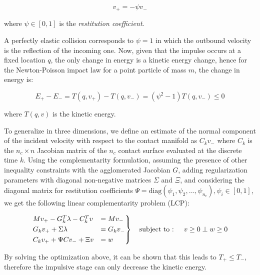 \begin{equation}
    v _{+} = -\psi v _{-}
\end{equation}

where $\psi \in [0,1]$ is the \textit{restitution coefficient}.

A perfectly elastic collision corresponds to $\psi = 1$ in which the outbound velocity is the reflection of the incoming one. Now, given that the impulse occurs at a fixed location $q$, the only change in energy is a kinetic energy change, hence for the Newton-Poisson impact law for a point particle of mass $m$, the change in energy is:

\begin{equation}
    E _{+} - E _{-} = T(q, v _{+}) - T(q, v _{-}) = (\psi ^2 - 1) T(q, v _{-}) \leq 0
\end{equation}

where $T(q, v)$ is the kinetic energy.

To generalize in three dimensions, we define an estimate of the normal component of the incident velocity with respect to the contact manifold as $C _k v _{-}$ where $C _k$ is the $n _c \times n$ Jacobian matrix of the $n _c$ contact surface evaluated at the discrete time $k$. Using the complementarity formulation, assuming the presence of other inequality constraints with the agglomerated Jacobian $G$, adding regularization parameters with diagonal non-negative matrices $\Sigma$ and $\Xi$, and considering the diagonal matrix for restitution coefficients $\Psi = \text{diag}(\psi _1, \psi _2, \dots, \psi _{n _c}),  \psi _i \in [0, 1]$, we get the following linear complementarity problem (LCP):

\begin{equation}
    \begin{rcases}
        Mv _{+} - G ^T _k \lambda - C ^T _k v & = M v _{-}    \\
        G _k v _{+} + \Sigma \lambda          & = G _k v _{-} \\
        C _k v _{+} + \Psi C v _{-} + \Xi v   & = w           \\
    \end{rcases} \quad \text{subject to
        :  } \quad v \geq 0 \perp w \geq 0
\end{equation}

By solving the optimization above, it can be shown that this leads to $T _{+} \leq T _{-}$, therefore the impulsive stage can only decrease the kinetic energy.